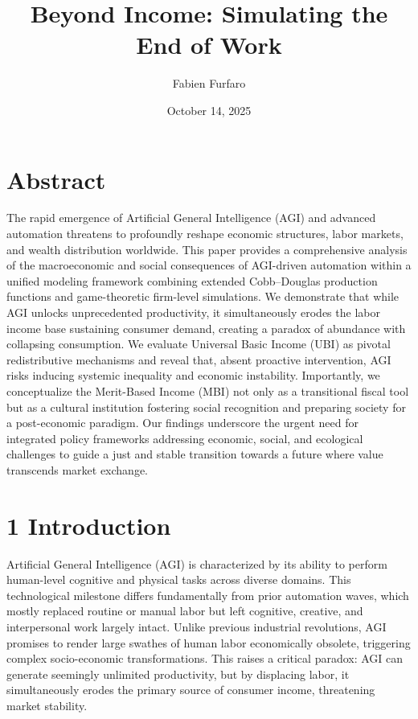 \documentclass[11pt]{amsart}
\title{Beyond Income: Simulating the End of Work}
\author{Fabien Furfaro}
\date{October 14, 2025}
\begin{document}
\maketitle
\tableofcontents
\hypertarget{x-abstract}{\section{Abstract}}
The rapid emergence of Artificial General Intelligence (AGI) and advanced automation threatens to profoundly reshape economic structures, labor markets, and wealth distribution worldwide. This paper provides a comprehensive analysis of the macroeconomic and social consequences of AGI-driven automation within a unified modeling framework combining extended Cobb–Douglas production functions and game-theoretic firm-level simulations. We demonstrate that while AGI unlocks unprecedented productivity, it simultaneously erodes the labor income base sustaining consumer demand, creating a paradox of abundance with collapsing consumption. We evaluate Universal Basic Income (UBI) as pivotal redistributive mechanisms and reveal that, absent proactive intervention, AGI risks inducing systemic inequality and economic instability. Importantly, we conceptualize the Merit-Based Income (MBI) not only as a transitional fiscal tool but as a cultural institution fostering social recognition and preparing society for a post-economic paradigm. Our findings underscore the urgent need for integrated policy frameworks addressing economic, social, and ecological challenges to guide a just and stable transition towards a future where value transcends market exchange.



\hypertarget{x-1-introduction}{\section{1 Introduction}}
Artificial General Intelligence (AGI) is characterized by its ability to perform human-level cognitive and physical tasks across diverse domains. This technological milestone differs fundamentally from prior automation waves, which mostly replaced routine or manual labor but left cognitive, creative, and interpersonal work largely intact. Unlike previous industrial revolutions, AGI promises to render large swathes of human labor economically obsolete, triggering complex socio-economic transformations. This raises a critical paradox: AGI can generate seemingly unlimited productivity, but by displacing labor, it simultaneously erodes the primary source of consumer income, threatening market stability.
\end{document}
